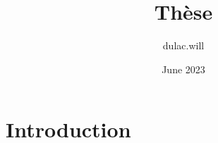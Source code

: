 \documentclass{article}
\title{Thèse}
\author{dulac.will }
\date{June 2023}
\begin{document}
\maketitle

\section{Introduction}
\end{document}
